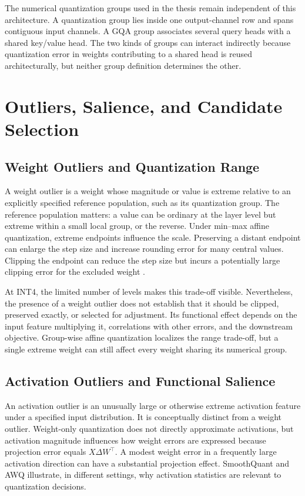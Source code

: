 The numerical quantization groups used in the thesis remain independent of this architecture. A quantization group lies inside one output-channel row and spans contiguous input channels. A GQA group associates several query heads with a shared key/value head. The two kinds of groups can interact indirectly because quantization error in weights contributing to a shared head is reused architecturally, but neither group definition determines the other.

\section{Outliers, Salience, and Candidate Selection}

\subsection{Weight Outliers and Quantization Range}

A weight outlier is a weight whose magnitude or value is extreme relative to an explicitly specified reference population, such as its quantization group. The reference population matters: a value can be ordinary at the layer level but extreme within a small local group, or the reverse. Under min--max affine quantization, extreme endpoints influence the scale. Preserving a distant endpoint can enlarge the step size and increase rounding error for many central values. Clipping the endpoint can reduce the step size but incurs a potentially large clipping error for the excluded weight \cite{gholami2021survey,banner2019post}.

At INT4, the limited number of levels makes this trade-off visible. Nevertheless, the presence of a weight outlier does not establish that it should be clipped, preserved exactly, or selected for adjustment. Its functional effect depends on the input feature multiplying it, correlations with other errors, and the downstream objective. Group-wise affine quantization localizes the range trade-off, but a single extreme weight can still affect every weight sharing its numerical group.

\subsection{Activation Outliers and Functional Salience}

An activation outlier is an unusually large or otherwise extreme activation feature under a specified input distribution. It is conceptually distinct from a weight outlier. Weight-only quantization does not directly approximate activations, but activation magnitude influences how weight errors are expressed because projection error equals $X\Delta W^\top$. A modest weight error in a frequently large activation direction can have a substantial projection effect. SmoothQuant \cite{xiao2023smoothquant} and AWQ \cite{lin2023awq} illustrate, in different settings, why activation statistics are relevant to quantization decisions.

